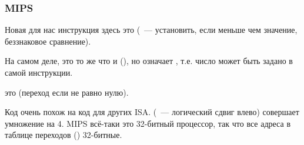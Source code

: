 \subsubsection{MIPS}



Новая для нас инструкция здесь это  (~--- установить,
если меньше чем значение, беззнаковое сравнение).

На самом деле, это то же что и  (), но  означает ,
т.е. число может быть задано в самой инструкции.

 это  (переход если не равно нулю).

Код очень похож на код для других \ac{ISA}.
 (~--- логический сдвиг влево) совершает умножение на 4.
MIPS всё-таки это 32-битный процессор, так что все адреса в таблице переходов () 32-битные.


